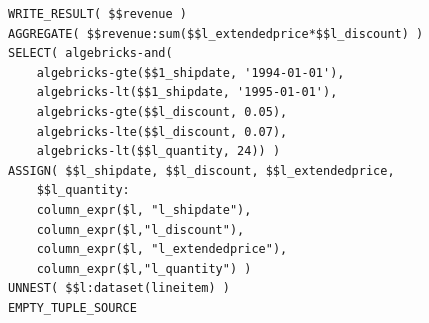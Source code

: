 
\begin{center}
\scriptsize
\begin{lstlisting}
WRITE_RESULT( $$revenue )
AGGREGATE( $$revenue:sum($$l_extendedprice*$$l_discount) )
SELECT( algebricks-and(
    algebricks-gte($$1_shipdate, '1994-01-01'),
    algebricks-lt($$1_shipdate, '1995-01-01'),
    algebricks-gte($$l_discount, 0.05),
    algebricks-lte($$l_discount, 0.07),
    algebricks-lt($$l_quantity, 24)) )
ASSIGN( $$l_shipdate, $$l_discount, $$l_extendedprice, 
    $$l_quantity:
    column_expr($l, "l_shipdate"),
    column_expr($l,"l_discount"),
    column_expr($l, "l_extendedprice"),
    column_expr($l,"l_quantity") )
UNNEST( $$l:dataset(lineitem) )
EMPTY_TUPLE_SOURCE
\end{lstlisting}
\end{center}

